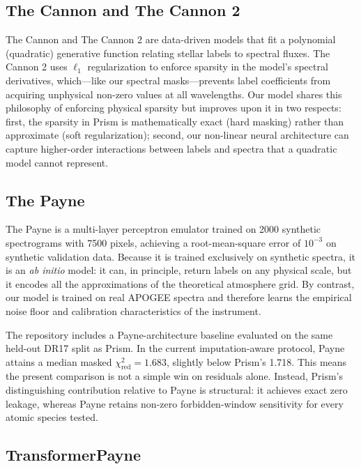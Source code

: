\documentclass[preprint]{aastex701-1/aastex701}
\begin{document}
\subsection{The Cannon and The Cannon 2}
\label{subsec:cannon}

The Cannon \citep{Ness2015Cannon} and The Cannon 2 \citep{Casey2016Cannon2} are
data-driven models that fit a polynomial (quadratic) generative function relating stellar
labels to spectral fluxes. The Cannon 2 uses $\ell_1$ regularization to enforce sparsity
in the model's spectral derivatives, which---like our spectral masks---prevents label
coefficients from acquiring unphysical non-zero values at all wavelengths. Our model shares
this philosophy of enforcing physical sparsity but improves upon it in two respects: first,
the sparsity in Prism is mathematically exact (hard masking) rather than approximate (soft
regularization); second, our non-linear neural architecture can capture higher-order
interactions between labels and spectra that a quadratic model cannot represent.

\subsection{The Payne}
\label{subsec:payne}

The Payne \citep{Ting2019Payne} is a multi-layer perceptron emulator trained on 2000
synthetic spectrograms with 7500 pixels, achieving a root-mean-square error of $10^{-3}$
on synthetic validation data. Because it is trained exclusively on synthetic spectra, it
is an \emph{ab initio} model: it can, in principle, return labels on any physical scale,
but it encodes all the approximations of the theoretical atmosphere grid. By contrast,
our model is trained on real APOGEE spectra and therefore learns the empirical noise floor
and calibration characteristics of the instrument.

The repository includes a Payne-architecture baseline evaluated on the same held-out DR17
split as Prism. In the current imputation-aware protocol, Payne attains a median masked
$\chi^2_\mathrm{red}=1.683$, slightly below Prism's 1.718. This means the present
comparison is not a simple win on residuals alone. Instead, Prism's distinguishing
contribution relative to Payne is structural: it achieves exact zero leakage, whereas
Payne retains non-zero forbidden-window sensitivity for every atomic species tested.

\subsection{TransformerPayne}
\label{subsec:transformerpayne}
\end{document}
